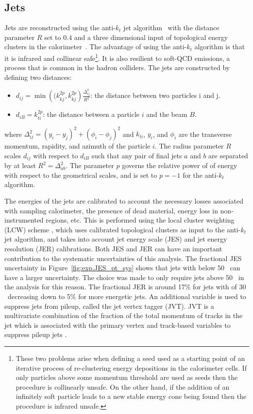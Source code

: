 \subsection{Jets}
Jets are reconstructed using the anti-$k_{t}$ jet algorithm~\cite{Cacciari:2008gp} 
with the distance parameter $R$ set to $0.4$ and 
a three dimensional input of topological energy clusters in the 
calorimeter~\cite{PERF-2014-07}. 
The advantage of using the anti-$k_{t}$ algorithm is that it is infrared
 and collinear safe\footnote{These two problems arise when defining a seed used 
as a starting point of an iterative process of re-clustering energy 
depositions in the calorimeter cells.
If only particles above some momentum threshold are used as seeds then the 
procedure is collinearly unsafe. On the other hand, if the addition of an 
infinitely soft particle leads to a new stable energy cone being found then 
the procedure is infrared unsafe.
}.
It is also resilient to soft-QCD emissions, a process that is common in the hadron colliders.
The jets are constructed by defining two distances:
\begin{itemize}
\item $d_{ij} = \min\left((k_{kj}^{2p},k_{kj}^{2p}\right)\frac{\Delta_{ij}^2}{R^2}$: the distance between two particles i and j.
\item $d_{iB} = k_{ti}^{2p}$: the distance between a particle $i$ and the beam $B$.
\end{itemize}
where $\Delta_{ij}^2 = \left( y_i - y_j\right)^2 + \left(\phi_i - \phi_j\right)^2$ and $k_{ti}$, $y_i$, and $\phi_i$ are the transverse momentum, rapidity, and azimuth of the 
particle $i$. The radius parameter $R$ scales $d_{ij}$ with respect to $d_{iB}$ such that any pair of final jets $a$ and $b$ are separated by at least $R^2=\Delta_{ab}^2$.
The parameter $p$ governs the relative power of of energy with respect to the geometrical scales, and is set to $p=-1$ for the anti-$k_{t}$ algorithm.


The energies of the jets are calibrated to  account the necessary losses associated with sampling calorimeter,
the presence of dead material,  energy loss in non-instrumented regions, etc. This is performed using the local cluster weighting
(LCW) scheme \cite{Aad:2016upyew}, which uses calibrated topological clusters as input to the anti-$k_{t}$ jet algorithm,
and takes into account jet energy scale (JES) and jet energy resolution (JER) calibrations.
Both JES and JER can have an important contribution to the systematic uncertainties of this analysis.
The fractional JES uncertainty in Figure~\ref{fig:exp.JES_pt_sys} shows that jets with \pt below 50 \GeV~can have a larger uncertainty.
The choice was made to only require jets above 50 \GeV~in the analysis for this reason.
The fractional JER is around 17\% for jets with \pt of 30 \GeV~decreasing down to 5\% for more energetic jets.
An additional variable is used to suppress jets from pileup, called the jet vertex tagger (JVT).
JVT is a multivariate combination of the fraction of the total momentum of tracks in the jet which is associated with the primary vertex
and  track-based variables to suppress pileup jets \cite{ATL-PHYS-PUB-2015-034}. 

